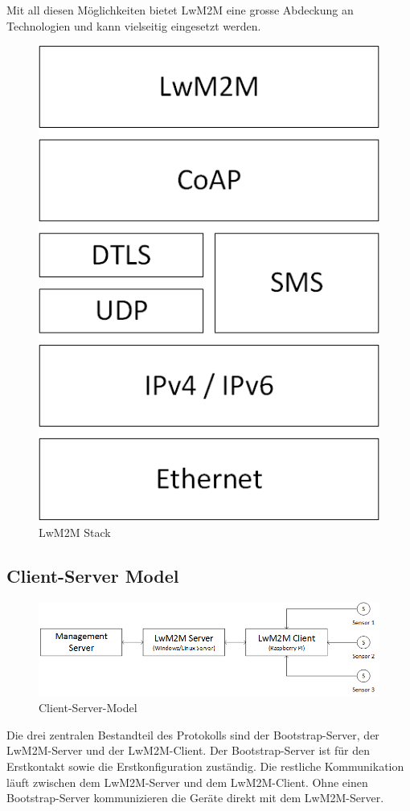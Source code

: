 Mit all diesen Möglichkeiten bietet LwM2M eine grosse Abdeckung an Technologien und kann vielseitig eingesetzt werden. 
\begin{figure}[H]
\includegraphics[scale=0.3]{../02_Analyse/images/lwm2m/stack.png}
\caption{LwM2M Stack}
\end{figure}

\newpage

\subsection{Client-Server Model}
\begin{figure}[H]
\includegraphics[scale=0.5]{../02_Analyse/images/lwm2m/server_client_model.png}
\caption{Client-Server-Model}
\end{figure}
Die drei zentralen Bestandteil des Protokolls sind der Bootstrap-Server, der LwM2M-Server und der LwM2M-Client. Der Bootstrap-Server ist für den Erstkontakt sowie die Erstkonfiguration zuständig. Die restliche Kommunikation läuft zwischen dem LwM2M-Server und dem LwM2M-Client. Ohne einen Bootstrap-Server kommunizieren die Geräte direkt mit dem LwM2M-Server.
